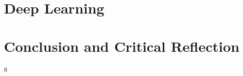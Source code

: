\documentclass[runningheads]{llncs}
\begin{document}
\section{Deep Learning}\label{sec:deep}



\section{Conclusion and Critical Reflection}\label{sec:conclusion}



\begin{thebibliography}{8}



\end{thebibliography}
\end{document}

